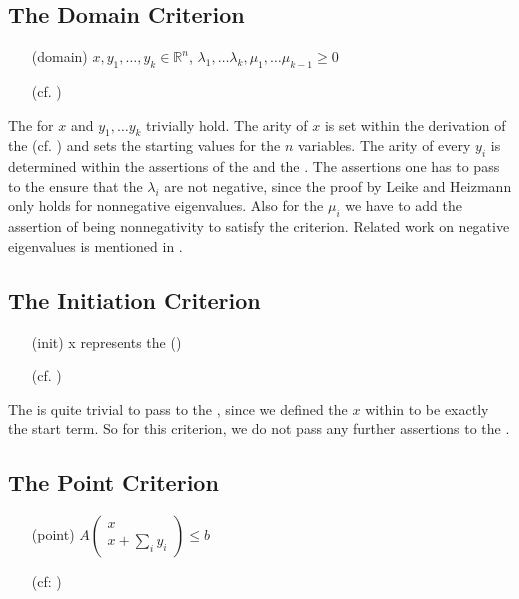 \subsection{The Domain Criterion}
\begin{itemize}
	\setlength{\itemindent}{1in}
	\item[(domain)] $x, y_1, \dots, y_k \in \mathbb{R}^n$, $\lambda_1, \dots \lambda_k, \mu_1, \dots \mu_{k-1} \ge 0$
	\item[] (cf. )
\end{itemize}
The \domc for $x$ and $y_1, \dots y_k$ trivially hold.
The arity of $x$ is set within the derivation of the \stem (cf. ) and sets the starting values for the $n$ variables. The arity of every $y_i$ is determined within the assertions of the \pointc and the \rayc.\newline
The assertions one has to pass to the \solver ensure that the $\lambda_i$ are not negative, since the proof by Leike and Heizmann only holds for nonnegative eigenvalues. Also for the $\mu_i$ we have to add the assertion of being nonnegativity to satisfy the criterion. \newline
Related work on negative eigenvalues is mentioned in .
\subsection{The Initiation Criterion}
\begin{itemize}
	\setlength{\itemindent}{1in}
	\item[(init)] x represents the \startterm (\stem)
	\item[] (cf. )
\end{itemize}

The \initc is quite trivial to pass to the \solver, since we defined the \stem $x$ within  to be exactly the start term. So for this criterion, we do not pass any further assertions to the \solver.

\subsection{The Point Criterion}
\label{sec:point-criteria}
\begin{itemize}
	\setlength{\itemindent}{1in}
	\item[(point)] $A\begin{pmatrix} x \\ x + \sum_i y_i \end{pmatrix} \le b$
	\item[] (cf: )
\end{itemize}

